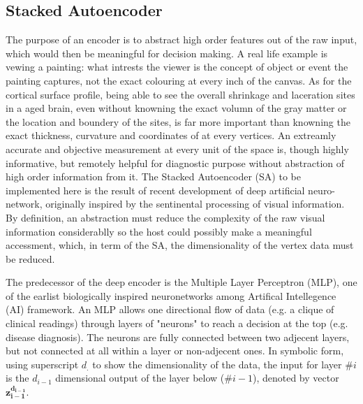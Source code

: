 \subsection{Stacked Autoencoder}
The purpose of an encoder is to abstract high order features out of the raw input, which would then be meaningful for decision making. A real life example is vewing a painting: what intrests the viewer is the concept of object or event the painting captures, not the exact colouring at every inch of the canvas. As for the cortical surface profile, being able to see the overall shrinkage and laceration sites in a aged brain, even without knowning the exact volumn of the gray matter or the location and boundery of the sites, is far more important than knowning the exact thickness, curvature and coordinates of at every vertices. An extreamly accurate and objective measurement at every unit of the space is, though highly informative, but remotely helpful for diagnostic purpose without abstraction of high order information from it. The Stacked Autoencoder (SA) to be implemented here is the result of recent development of deep artificial neuro-network, originally inspired by the sentinental processing of visual information. By definition, an abstraction must reduce the complexity of the raw visual information considerablly so the host could possibly make a meaningful accessment, which, in term of the SA, the dimensionality of the vertex data must be reduced. 

The predecessor of the deep encoder is the Multiple Layer Perceptron (MLP), one of the earlist biologically inspired neuronetworks among Artifical Intellegence (AI) framework. An MLP allows one directional flow of data (e.g. a clique of clinical readings) through layers of "neurons" to reach a decision at the top (e.g. disease diagnosis). The neurons are fully connected between two adjecent layers, but not connected at all within a layer or non-adjecent ones. In symbolic form, using superscript $d_.$ to show the dimensionality of the data, the input for layer $\#i$ is the $d_{i-1}$ dimensional output of the layer below ($\#i-1$), denoted by vector $\boldsymbol{z_{i-1}^{d_{i-1}}}$.  

